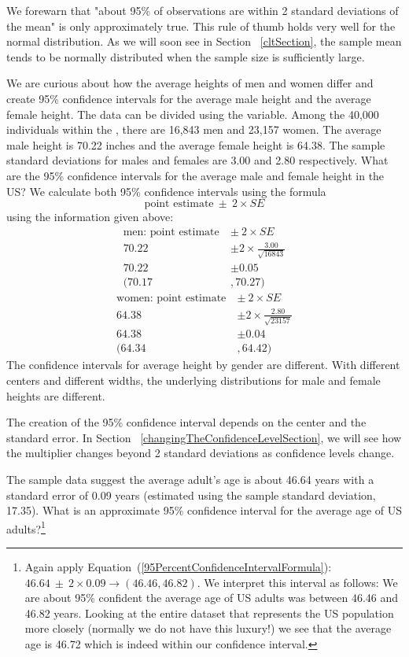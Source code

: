We forewarn that "about 95\% of observations are within 2 standard deviations of the mean" is only approximately true. This rule of thumb holds very well for the normal distribution. As we will soon see in Section ~\ref{cltSection}, the sample mean tends to be normally distributed when the sample size is sufficiently large. 

\begin{example}{We are curious about how the average heights of men and women differ and create 95\% confidence intervals for the average male height and the average female height. The  data can be divided using the  variable. Among the 40,000 individuals within the , there are 16,843 men and 23,157 women. The average male height is 70.22 inches and the average female height is 64.38. The sample standard deviations for males and females  are 3.00 and 2.80 respectively. What are the 95\% confidence intervals for the average male and female height in the US? }\label{CIforGenderHeight}
We calculate both 95\% confidence intervals using the formula \[\text{point estimate}\ \pm\ 2 \times SE\] using the information given above: 
\begin{align*}
\text{men: point estimate}\ &\pm\ 2 \times SE\\
70.22 &\pm 2\times \frac{3.00}{\sqrt{16843}}\\
70.22 &\pm  0.05 \\
(70.17 &, 70.27)
\end{align*}
\begin{align*}
\text{women: point estimate}\ &\pm\ 2 \times SE\\
64.38 &\pm 2\times \frac{2.80}{\sqrt{23157}}\\
64.38 &\pm  0.04\\
(64.34 &, 64.42)
\end{align*}
The confidence intervals for average height by gender are different. With different centers and different widths, the underlying distributions for male and female heights are different. \end{example}

The creation of the 95\% confidence interval depends on the center and the standard error. In Section ~\ref{changingTheConfidenceLevelSection}, we will see how the multiplier changes beyond 2 standard deviations as confidence levels change. 

\begin{exercise} \label{95CIExerciseForBRFSSAge}
The sample data  suggest the average adult's age is about 46.64 years with a standard error of 0.09 years (estimated using the sample standard deviation, 17.35). What is an approximate 95\% confidence interval for the average age of US adults?\footnote{Again apply Equation~(\ref{95PercentConfidenceIntervalFormula}): $46.64 \ \pm \ 2\times 0.09 \rightarrow (46.46, 46.82)$. We interpret this interval as follows: We are about 95\% confident the average age of US adults was between 46.46 and 46.82 years. Looking at the entire dataset  that represents the US population more closely (normally we do not have this luxury!) we see that the average age is 46.72 which is indeed within our confidence interval.}
\end{exercise}

